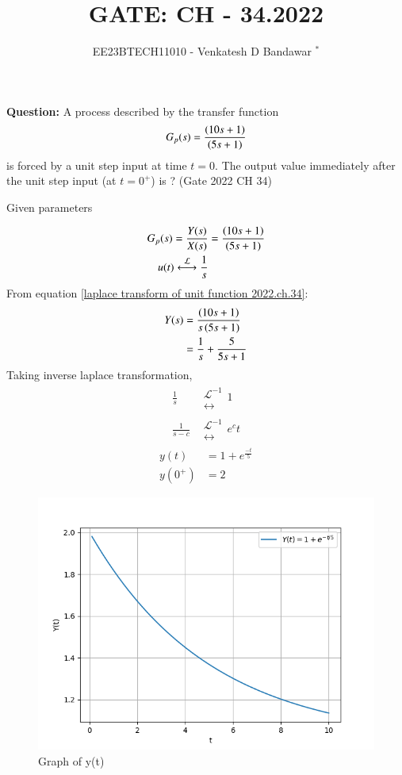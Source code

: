 \documentclass[journal,12pt,twocolumn]{IEEEtran}
\theoremstyle{remark}
\begin{document}

\vspace{3cm}

\title{GATE: CH - 34.2022}
\author{EE23BTECH11010 - Venkatesh D Bandawar $^{*}$%
}
\maketitle
\bigskip


\textbf{Question:} A process described by the transfer function
\begin{align}
    G_p(s) = \frac{\left(10s+1\right)}{\left(5s+1\right)} \nonumber
\end{align}
is forced by a unit step input at time $t = 0$. The output value immediately after the unit step input (at $t = 0^+$) is ? \hfill(Gate 2022 CH 34)\\
\solution
\begin{table}[!h] 
\centering

\caption{Given parameters}
\label{given parameters list.gate.2022.ch.34}
\end{table}
\begin{align}
    G_p(s) = \frac{Y(s)}{X(s)} &= \frac{\brak{10s+1}}{\brak{5s+1}}\\
    u(t) \system{\mathcal{L}} \frac{1}{s} \label{laplace transform of unit function 2022.ch.34}
\end{align}
From equation \eqref{laplace transform of unit function 2022.ch.34}:
\begin{align}
    Y(s) &= \frac{\left(10s+1\right)}{s\left(5s+1\right)}\\
    &= \frac{1}{s} + \frac{5}{5s+1}
\end{align}
Taking inverse laplace transformation, 
\begin{align}
    \frac{1}{s} &\mathrel{\substack{\mathcal{L}^{-1}\\\longleftrightarrow}} 1\\
    \frac{1}{s-c} &\mathrel{\substack{\mathcal{L}^{-1}\\\longleftrightarrow}} e^ct
\end{align}
\begin{align}
    y(t) &= 1 + e^{\frac{-t}{5}}\\
    y(0^+) &= 2
\end{align}

\begin{figure}[!h] 
    \centering
    \includegraphics[width=\columnwidth]{figs/Graph_of_y(t).png}
    \caption{Graph of y(t)}
    \label{fig:Graph1_gate_CE_30}
    \end{figure}
\end{document}
